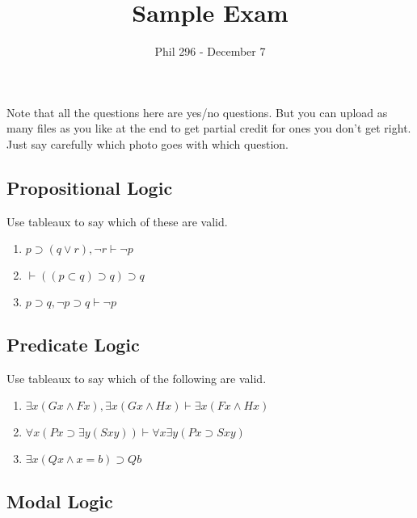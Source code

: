 \documentclass[
]{article}
\title{Sample Exam}
\author{Phil 296 - December 7}
\date{}
\providecommand{\tightlist}{%
  \setlength{\itemsep}{0pt}\setlength{\parskip}{0pt}}\usepackage{longtable,booktabs,array}
\begin{document}
\maketitle
\ifdefined\Shaded\renewenvironment{Shaded}{\begin{tcolorbox}[breakable, interior hidden, borderline west={3pt}{0pt}{shadecolor}, boxrule=0pt, enhanced, sharp corners, frame hidden]}{\end{tcolorbox}}\fi

Note that all the questions here are yes/no questions. But you can
upload as many files as you like at the end to get partial credit for
ones you don't get right. Just say carefully which photo goes with which
question.

\hypertarget{propositional-logic}{%
\subsection{Propositional Logic}\label{propositional-logic}}

Use tableaux to say which of these are valid.

\begin{enumerate}
\def\labelenumi{\arabic{enumi}.}
\tightlist
\item
  \(p \supset (q \vee r), \neg r \vdash \neg p\)
\item
  \(\vdash ((p \subset q) \supset q) \supset q\)
\item
  \(p \supset q, \neg p \supset q \vdash \neg p\)
\end{enumerate}

\hypertarget{predicate-logic}{%
\subsection{Predicate Logic}\label{predicate-logic}}

Use tableaux to say which of the following are valid.

\begin{enumerate}
\def\labelenumi{\arabic{enumi}.}
\setcounter{enumi}{3}
\tightlist
\item
  \(\exists x(Gx \wedge Fx), \exists x(Gx \wedge Hx) \vdash \exists x (Fx \wedge Hx)\)
\item
  \(\forall x(Px \supset \exists y (Sxy)) \vdash \forall x \exists y (Px \supset Sxy)\)
\item
  \(\exists x(Qx \wedge x = b) \supset Qb\)
\end{enumerate}

\hypertarget{modal-logic}{%
\subsection{Modal Logic}\label{modal-logic}}
\end{document}
